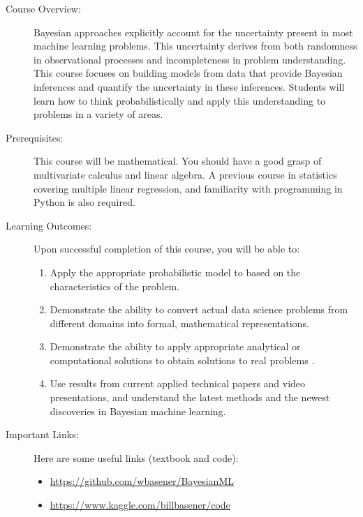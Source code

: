 \documentclass[11pt]{article}
\begin{document}
\begin{description}

\item[Course Overview:] 

Bayesian approaches explicitly account for the uncertainty present in most machine learning problems. This uncertainty derives from both randomness in observational processes and incompleteness in problem understanding. This course focuses on building models from data that provide Bayesian inferences and quantify the uncertainty in these inferences. Students will learn how to think probabilistically and apply this understanding to problems in a variety of areas.

\item[Prerequisites:] This course will be mathematical. You should have a good grasp of multivariate calculus and linear
  algebra. A previous course in statistics covering multiple linear regression, and familiarity with programming in Python is also required.

\item[Learning Outcomes:]  

Upon successful completion of this course, you will be able to:

\begin{enumerate}
\item Apply the appropriate probabilistic model to based on the characteristics of the problem.
\item Demonstrate the ability to convert actual data science problems from different domains into formal, mathematical representations.
\item Demonstrate the ability to apply appropriate analytical or computational solutions to obtain solutions to real problems .
\item Use results from current applied technical papers and video presentations, and understand the latest methods and the newest discoveries in Bayesian machine learning.
\end{enumerate}

\item[Important Links:]  

Here are some useful links (textbook and code):
\begin{itemize}
\item \url{https://github.com/wbasener/BayesianML}
\item \url{https://www.kaggle.com/billbasener/code}
\end{itemize}



\end{description}
\end{document}
